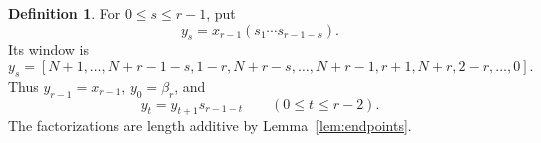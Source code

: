 \documentclass[11pt,a4paper,reqno]{amsart}
\numberwithin{equation}{section}
\theoremstyle{definition}
\newtheorem{definition}[theorem]{Definition}
\theoremstyle{remark}
\theoremstyle{plain}
\begin{document}
\begin{definition}\label{def:second-chain}
For $0\leq s\leq r-1$, put
\begin{equation}\label{eq:second-chain-product}
 y_s=x_{r-1}(s_1\cdots s_{r-1-s}).
\end{equation}
Its window is
\begin{equation}\label{eq:second-chain}
   y_s=[N+1,\ldots,N+r-1-s,1-r,N+r-s,\ldots,N+r-1, 
      r+1,N+r,2-r,\ldots,0].  
\end{equation}
Thus $y_{r-1}=x_{r-1}$, $y_0=\beta_r$, and
\[
 y_t=y_{t+1}s_{r-1-t}\qquad(0\leq t\leq r-2).
\]
The factorizations are length additive by Lemma~\ref{lem:endpoints}.
\end{definition}
\end{document}
